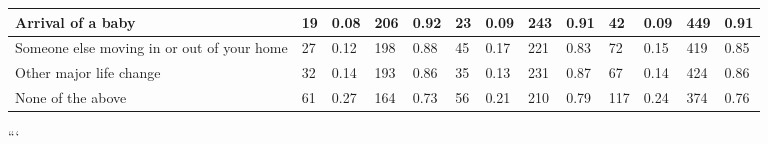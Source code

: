 \documentclass[]{article}
\begin{document}
\begin{table}[t]
\begin{tabular}{l|l|l|l|l|l|l|l|l|l|l|l|l}
\hline
Arrival of a baby & 19 & 0.08 & 206 & 0.92 & 23 & 0.09 & 243 & 0.91 & 42 & 0.09 & 449 & 0.91\\
\hline
Someone else moving in or out of your home & 27 & 0.12 & 198 & 0.88 & 45 & 0.17 & 221 & 0.83 & 72 & 0.15 & 419 & 0.85\\
\hline
Other major life change & 32 & 0.14 & 193 & 0.86 & 35 & 0.13 & 231 & 0.87 & 67 & 0.14 & 424 & 0.86\\
\hline
None of the above & 61 & 0.27 & 164 & 0.73 & 56 & 0.21 & 210 & 0.79 & 117 & 0.24 & 374 & 0.76\\
\hline
\end{tabular}
\end{table}

```

\hypertarget{section}{%
\section{}\label{section}}
\end{document}
